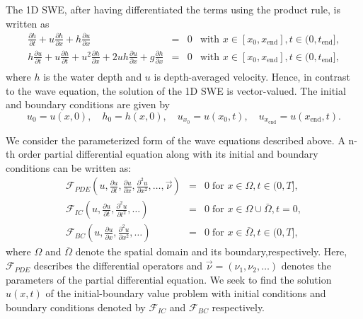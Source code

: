 The 1D SWE, after having differentiated the terms using the product rule, is written as
\begin{equation}\label{eq:swe}
\begin{array}{rcll}
\displaystyle\frac{\partial h }{\partial t} + u \frac{\partial h }{\partial x} + h \frac{\partial u }{\partial x}  &=& 0
& \mbox{with } x \in [x_0, x_{\mathrm{end}}], t \in (0, t_{\mathrm{end}}],\\[1em]
\displaystyle  h \frac{\partial u }{\partial t} + u \frac{\partial h }{\partial t}  + u^2 \frac{\partial h }{\partial x} + 2uh\frac{\partial u }{\partial x} + g \frac{\partial h }{\partial x} &=& 0 & \mbox{with } x \in [x_0, x_{\mathrm{end}}], t \in (0, t_{\mathrm{end}}],\\[1em]
\end{array}
\end{equation}
where $h$ is the water depth and $u$ is depth-averaged velocity. Hence, in contrast to the wave equation, 
the solution of the 1D SWE is vector-valued. The initial  and boundary 
conditions are given by 
\begin{equation}\label{eq:swe_ic_bc}
u_0 =  u(x,0), \quad  h_0 = h(x,0),\quad 
u_{x_0}=u(x_0,t), \quad  u_{x_{\mathrm{end}}} = u(x_{\mathrm{end}}, t) . 
\end{equation}

We consider the parameterized form of the wave equations described above. A n-th order  partial differential equation along with its initial and boundary conditions can be written as: 
\begin{eqnarray}
  \label{eq:pde}
 \mathcal{F}_{PDE}\left(u, \frac{\partial u}{ \partial t}, \frac{\partial u}{ \partial x}, \frac{{\partial}^2 u}{\partial x^2}, \ldots, \vec{\nu}\right) &=&0 \;  \mbox{for } x \in \Omega, t \in (0,T],\\
\label{eq:ic}
  \mathcal{F}_{IC}\left(u, \frac{\partial u}{ \partial t}, \frac{\partial^2 u}{ \partial t^2}, \ldots\right) &=& 0 \;
 \mbox{for } x \in \Omega \cup \bar{\Omega}, t = 0,\\
\label{eq:bc} \mathcal{F}_{BC}\left(u, \frac{\partial u}{ \partial x}, \frac{\partial^2 u}{ \partial x^2}, \ldots   \right) &=&0 \;  \mbox{for } x \in  \bar{\Omega}, t \in (0,T], 
\end{eqnarray}
where $\Omega$ and $\bar{\Omega}$ denote the spatial domain and its boundary,respectively. 
Here, $\mathcal{F}_{PDE}$ describes the differential operators and $\vec{\nu} = (\nu_1, \nu_2, \ldots)$ 
denotes the parameters of the partial differential equation. We seek to find the solution $u(x,t)$ of the initial-boundary value 
problem with initial conditions and boundary conditions denoted by $\mathcal{F}_{IC}$ and $\mathcal{F}_{BC}$ respectively. 